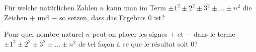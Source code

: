 Für welche natürlichen Zahlen $n$ kann man im Term $\pm 1^2 \pm 2^2 \pm 3^2 \pm \ldots \pm n^2$ die Zeichen $+$ und $-$ so setzen, dass das Ergebnis 0 ist?

\bigskip

Pour quel nombre naturel $n$ peut-on placer les signes $+$ et $-$ dans le terme $\pm 1^2 \pm 2^2 \pm 3^2 \pm \ldots \pm n^2$ de tel façon à ce que le résultat soit 0?